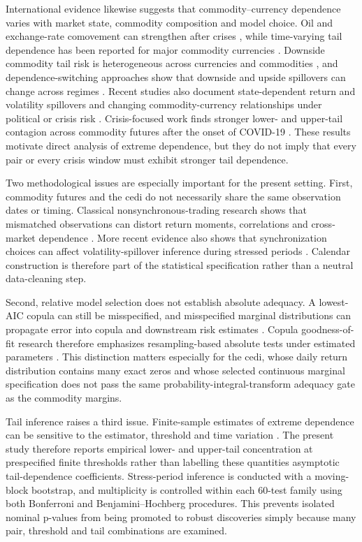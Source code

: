 International evidence likewise suggests that commodity--currency dependence varies with market state, commodity composition and model choice. Oil and exchange-rate comovement can strengthen after crises \citep{reboredo2012}, while time-varying tail dependence has been reported for major commodity currencies \citep{ignatieva2017}. Downside commodity tail risk is heterogeneous across currencies and commodities \citep{bondatti2022}, and dependence-switching approaches show that downside and upside spillovers can change across regimes \citep{ning2025}. Recent studies also document state-dependent return and volatility spillovers and changing commodity-currency relationships under political or crisis risk \citep{go2024,dodd2026}. Crisis-focused work finds stronger lower- and upper-tail contagion across commodity futures after the onset of COVID-19 \citep{qiao2023}. These results motivate direct analysis of extreme dependence, but they do not imply that every pair or every crisis window must exhibit stronger tail dependence.

Two methodological issues are especially important for the present setting. First, commodity futures and the cedi do not necessarily share the same observation dates or timing. Classical nonsynchronous-trading research shows that mismatched observations can distort return moments, correlations and cross-market dependence \citep{scholes1977,lo1990,martens2001,schotman2006}. More recent evidence also shows that synchronization choices can affect volatility-spillover inference during stressed periods \citep{dimitriou2025}. Calendar construction is therefore part of the statistical specification rather than a neutral data-cleaning step.

Second, relative model selection does not establish absolute adequacy. A lowest-AIC copula can still be misspecified, and misspecified marginal distributions can propagate error into copula and downstream risk estimates \citep{fantazzini2009}. Copula goodness-of-fit research therefore emphasizes resampling-based absolute tests under estimated parameters \citep{dobric2007,genestremillard2008,genest2009}. This distinction matters especially for the cedi, whose daily return distribution contains many exact zeros and whose selected continuous marginal specification does not pass the same probability-integral-transform adequacy gate as the commodity margins.

Tail inference raises a third issue. Finite-sample estimates of extreme dependence can be sensitive to the estimator, threshold and time variation \citep{frahm2005,supper2020}. The present study therefore reports empirical lower- and upper-tail concentration at prespecified finite thresholds rather than labelling these quantities asymptotic tail-dependence coefficients. Stress-period inference is conducted with a moving-block bootstrap, and multiplicity is controlled within each 60-test family using both Bonferroni and Benjamini--Hochberg procedures. This prevents isolated nominal p-values from being promoted to robust discoveries simply because many pair, threshold and tail combinations are examined.

